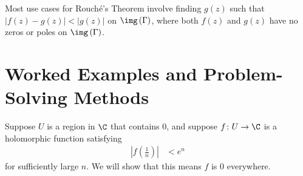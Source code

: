 \documentclass[10pt]{mypackage}
\begin{document}
\begin{remark}
  Most use cases for Rouché's Theorem involve finding $g(z)$ such that $\left\vert f(z) - g(z)\right\vert < \left\vert g(z) \right\vert$ on $\img\left( \Gamma \right)$, where both $f(z)$ and $g(z)$ have no zeros or poles on $\img\left( \Gamma \right)$.
\end{remark}
\section{Worked Examples and Problem-Solving Methods}%
\begin{example}
  Suppose $U$ is a region in $\C$ that contains $0$, and suppose $f\colon U\rightarrow \C$ is a holomorphic function satisfying
  \begin{align*}
    \left\vert f\left( \frac{1}{n} \right) \right\vert &< e^{n}
  \end{align*}
  for sufficiently large $n$. We will show that this means $f$ is $0$ everywhere.\newline


\end{example}
\end{document}
